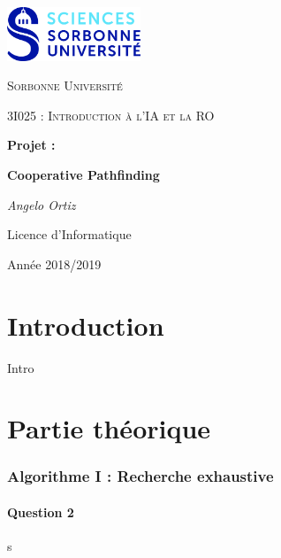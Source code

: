 \documentclass[12pt,a4paper]{article}
\begin{document}
\begin{titlepage}
	\centering
	\includegraphics[width=0.30\textwidth]{logo.jpg}\par\vspace{1cm}
	{\scshape\LARGE Sorbonne Universit\'e \par}
	\vspace{1cm}
	{\scshape\Large 3I025 : Introduction \`a l'IA et la RO\par}
	\vspace{1.5cm}
	{\Large \bfseries Projet :\par}
	{\huge\bfseries Cooperative Pathfinding\par}
	\vspace{2cm}
	{\Large\itshape Angelo Ortiz\par}
	
	\vfill

	{\large Licence d'Informatique\par}
	{\large Ann\'ee 2018/2019\par}
\end{titlepage}


\tableofcontents
\listoffigures
\listoftables

\newpage

\part*{Introduction}

Intro

\newpage
\part{Partie th\'eorique}

\section{Algorithme I : Recherche exhaustive}

\subsection*{Question 2}
s

	
\printindex
\end{document}
